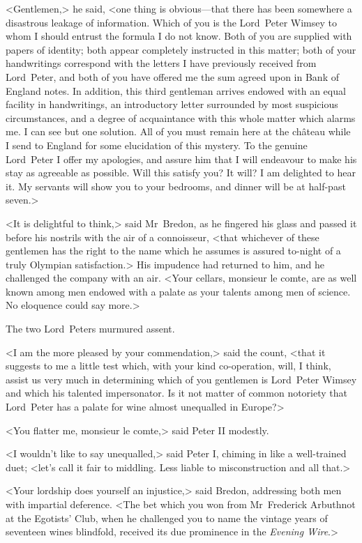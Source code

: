 <Gentlemen,> he said, <one thing is obvious—that there has been somewhere a disastrous leakage of information. Which of you is the Lord~Peter Wimsey to whom I should entrust the formula I do not know. Both of you are supplied with papers of identity; both appear completely instructed in this matter; both of your handwritings correspond with the letters I have previously received from Lord~Peter, and both of you have offered me the sum agreed upon in Bank of England notes. In addition, this third gentleman arrives endowed with an equal facility in handwritings, an introductory letter surrounded by most suspicious circumstances, and a degree of acquaintance with this whole matter which alarms me. I can see but one solution. All of you must remain here at the château while I send to England for some elucidation of this mystery. To the genuine Lord~Peter I offer my apologies, and assure him that I will endeavour to make his stay as agreeable as possible. Will this satisfy you? It will? I am delighted to hear it. My servants will show you to your bedrooms, and dinner will be at half-past seven.>

\divider
<It is delightful to think,> said Mr~Bredon, as he fingered his glass and passed it before his nostrils with the air of a connoisseur, <that whichever of these gentlemen has the right to the name which he assumes is assured to-night of a truly Olympian satisfaction.> His impudence had returned to him, and he challenged the company with an air. <Your cellars, monsieur le comte, are as well known among men endowed with a palate as your talents among men of science. No eloquence could say more.>

The two Lord~Peters murmured assent.

<I am the more pleased by your commendation,> said the count, <that it suggests to me a little test which, with your kind co-operation, will, I think, assist us very much in determining which of you gentlemen is Lord~Peter Wimsey and which his talented impersonator. Is it not matter of common notoriety that Lord~Peter has a palate for wine almost unequalled in Europe?>

<You flatter me, monsieur le comte,> said Peter II modestly.

<I wouldn't like to say unequalled,> said Peter I, chiming in like a well-trained duet; <let's call it fair to middling. Less liable to misconstruction and all that.>

<Your lordship does yourself an injustice,> said Bredon, addressing both men with impartial deference. <The bet which you won from Mr~Frederick Arbuthnot at the Egotists' Club, when he challenged you to name the vintage years of seventeen wines blindfold, received its due prominence in the \textit{Evening Wire}.>

